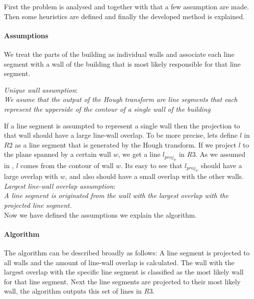 \documentclass[10pt]{article}
\begin{document}
	First the problem is analysed and together with that a few assumption are made.
	Then some heuristics are defined and finally the developed method is explained.

	\paragraph{Assumptions}
	We treat the parts of the building as individual walls and associate each
	line segment with a wall of the building that is most likely responsible for
	that line segment. 

	\emph{Unique wall assumption}:\\
	\emph{We asume that the output of the Hough transform are line segments that
	each represent the upperside of the contour of a single wall of the building}



	If a line segment is assumpted to represent a single wall then the
	projection to that wall should have a large line-wall overlap. To be more
	precise, lets define $l$ in $R2$ as a line segment that is generated by the Hough
	transform.  If we project $l$ to the plane spanned by a certain wall $w$, we
	get a line $l_{proj_w}$ in $R3$.  As we assumed in %
	, $l$ comes from the contour of wall $w$. Its easy to see that $l_{proj_w}$
	should have a large overlap with $w$, and also should have a small overlap with
	the other walls.
	\emph{Largest line-wall overlap assumption}:\\
	\emph{A line segment is originated from the wall with the largest overlap
	with the projected line segment.}\\

	Now we have defined the assumptions we explain the algorithm.

	\paragraph{Algorithm}
	The algorithm can be described broadly as follows:
	A line segment is projected to all walls and the amount of line-wall overlap is
	calculated. The wall with the largest overlap with the specific line
segment is classified as the most likely wall for that line segment.
	Next the line segments are projected to their most likely wall, the
	algorithm outputs this set of lines in $R3$. 
	
\end{document}
